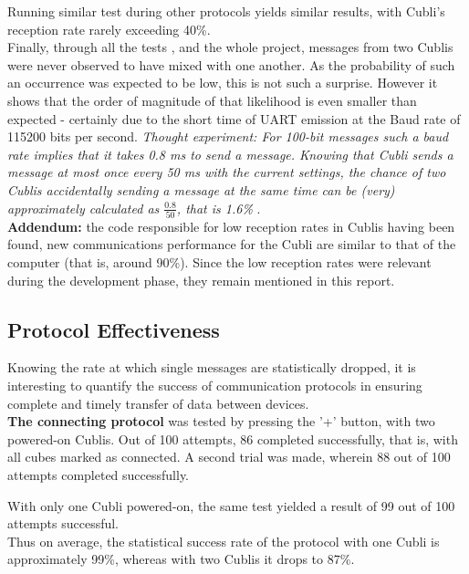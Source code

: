 Running similar test during other protocols yields similar results, with Cubli's reception rate rarely exceeding 40\%.\\

Finally, through all the tests , and the whole project, messages from two Cublis were never observed to have mixed with one another. As the probability of such an occurrence was expected to be low, this is not such a surprise. However it shows that the order of magnitude of that likelihood is even smaller than expected - certainly due to the short time of UART emission at the Baud rate of 115200 bits per second. \textit{ Thought experiment: For 100-bit messages such a baud rate implies that it takes 0.8 ms to send a message. Knowing that Cubli sends a message at most once every 50 ms with the current settings, the chance of two Cublis accidentally sending a message at the same time can be (very) approximately calculated as $\frac{0.8}{50}$, that is 1.6\% }.\\

\textbf{Addendum:} the code responsible for low reception rates in Cublis having been found, new communications performance for the Cubli are similar to that of the computer (that is, around 90\%). Since the low reception rates were relevant during the development phase, they remain mentioned in this report.

\subsection{Protocol Effectiveness}

Knowing the rate at which single messages are statistically dropped, it is interesting to quantify the success of communication protocols in ensuring complete and timely transfer of data between devices. \\

\textbf{The connecting protocol} was tested by pressing the '+' button, with two powered-on Cublis. Out of 100 attempts, 86 completed successfully, that is, with all cubes marked as connected. A second trial was made, wherein 88 out of 100 attempts completed successfully.

With only one Cubli powered-on, the same test yielded a result of 99 out of 100 attempts successful.\\

Thus on average, the statistical success rate of the protocol with one Cubli is approximately 99\%, whereas with two Cublis it drops to 87\%. \\

